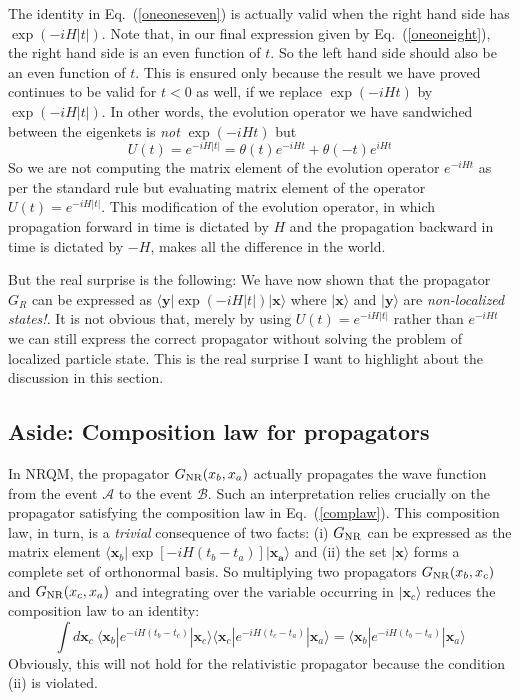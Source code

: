 \documentclass[12pt]{article}
\def\eq#1{{Eq.~(\ref{#1})}}
\def\ket#1{|#1\rangle}                    %
\def\bk#1#2#3{{\langle #1|#2|#3\rangle}}  %
\begin{document}
The identity in \eq{oneoneseven} is actually valid when the right hand side has $\exp(-iH|t|)$. Note that, in our final expression given by \eq{oneoneight}, the right hand side is an even function of $t$. So the left hand side should also be an even function of $t$. This is ensured only because the result we have proved continues to be valid for $t<0$ as well, if we replace $\exp(-iHt)$ by $\exp(-iH|t|)$. In other words, the evolution operator we have sandwiched between the eigenkets is \textit{not} $\exp(-iHt)$ but 
\begin{equation}
 U(t) = e^{-iH|t|} = \theta(t) e^{-iHt} + \theta(-t) e^{iHt} 
\end{equation} 
So we are not computing the matrix element of the evolution operator $e^{-iHt}$ as per the standard rule but evaluating matrix element of the operator $U(t) = e^{-iH|t|}$. This modification of the evolution operator, in which propagation forward in time is dictated by $H$ and the propagation backward in time is dictated by $-H$, makes all the difference in the world. 

But the real surprise is the following: We have now shown that the propagator $G_R$ can be expressed as $\bk{\bm y}{\exp(-iH|t|)}{\bm x}$ where $\ket{\bm x}$ and $\ket{\bm y}$ are \textit{non-localized states!}. It is not obvious that, merely by using $U(t) = e^{-iH|t|}$ rather than $e^{-iHt}$ we can still express the correct propagator without solving the problem of localized particle state. This is the real surprise I want to highlight about the discussion in this section.



\subsection{Aside: Composition law for propagators}\label{sec:compo}

 In NRQM, the propagator $G_{\rm NR}(x_b,x_a)$ actually propagates the wave function from the event $\mathcal{A}$ to the event $\mathcal{B}$. Such an interpretation relies crucially on the propagator satisfying the composition law in \eq{complaw}. This composition law, in turn,  is a \textit{trivial} consequence of two facts: (i) $G_{\rm NR}$ can be expressed as the matrix element $\bk{\bm{x}_b}{\exp[-iH(t_b - t_a)]}{\bm{x_a}}$ and (ii) the set $\ket{\bm{x}}$ forms a complete set of orthonormal basis. So multiplying two propagators $G_{\rm NR}(x_b,x_c)$ and $G_{\rm NR}(x_c,x_a)$  and integrating over the variable occurring in $\ket{\bm{x}_c}$  reduces the composition law to an identity:
 \begin{equation}
  \int d\bm{x}_c\ \bk{\bm{x}_b}{e^{-iH(t_b - t_c)}}{\bm{x}_c} \bk{\bm{x}_c}{e^{-iH(t_c - t_a)}}{\bm{x}_a}
  = \bk{\bm{x}_b}{e^{-iH(t_b - t_a)}}{\bm{x}_a}
 \end{equation} 
 Obviously, this will not hold for the relativistic propagator because  the condition  (ii) is violated. 
 
\end{document}
